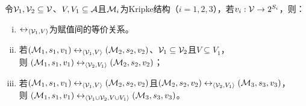 \begin{proposition} \label{pro:EqUnion}
	令${\cal V}_1, {\cal V}_2\subseteq {\cal V}$、$V, V_1 \subseteq {\cal A}$且${\cal M}_i$为Kripke结构（$i=1,2,3$），若$v_i: {\cal V}\rightarrow 2^{S_i}$，则：
	\begin{enumerate} [(i)]
		\item $\leftrightarrow_{{\langle{{\cal V}_1,V}\rangle}}$为赋值间的等价关系。
		\item 若$({\cal M}_1, s_1,v_1) \leftrightarrow_{{\langle{{\cal V}_1,V}\rangle}} ({\cal M}_2,s_2,v_2)$、${\cal V}_1 \subseteq {\cal V}_2$且$V \subseteq V_1$，\\
		则 $({\cal M}_1, s_1, v_1) \leftrightarrow_{{\langle{{\cal V}_2,V_1}\rangle}} ({\cal M}_2, s_2, v_2)$；
		\item 若$({\cal M}_1, s_1, v_1) \leftrightarrow_{{\langle{{\cal V}_1,V}\rangle}} ({\cal M}_2,s_2, v_2)$且$({\cal M}_2,s_2, v_2) \leftrightarrow_{{\langle{{\cal V}_2,V_1}\rangle}} ({\cal M}_3,s_3, v_3)$，\\
		则 $({\cal M}_1,s_1,v_1) \leftrightarrow_{{\langle{{\cal V}_1 \cup {\cal V}_2, V \cup V_1}\rangle}} ({\cal M}_3,s_3,v_3)$。
	\end{enumerate}
%	
\end{proposition}
